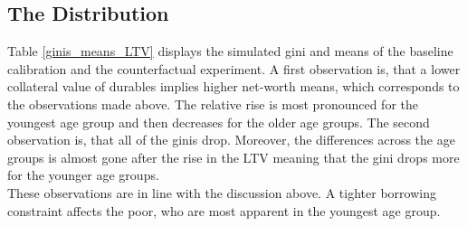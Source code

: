 \documentclass[a4paper,12pt,legno]{article}
\begin{document}
\subsection{The Distribution}
Table \ref{ginis_means_LTV} displays the simulated gini and means of the baseline calibration and the counterfactual experiment. A first observation is, that a lower collateral value of durables implies higher net-worth means, which corresponds to the observations made above. The relative rise is most pronounced for the youngest age group and then decreases for the older age groups. 
The second observation is, that all of the ginis drop. Moreover, the differences across the age groups is almost gone after the rise in the LTV meaning that the gini drops more for the younger age groups. \\ These observations are in line with the discussion above. A tighter borrowing constraint affects the poor, who are most apparent in the youngest age group. 
\end{document}
